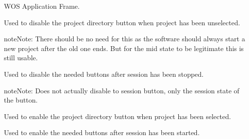\documentclass[letterpaper,10pt,english]{sphinxmanual}
\begin{document}
\begin{fulllineitems}
\label{diwacs:diwacs.GraphicalUserInterface}
WOS Application Frame.

\begin{fulllineitems}
\label{diwacs:diwacs.GraphicalUserInterface.DisableDirectoryButton}
Used to disable the project directory button when project has been
unselected.

\begin{notice}{note}{Note:}
There should be no need for this as the software should
always start a new project after the old one ends.
But for the mid state to be legitimate this is still
usable.
\end{notice}

\end{fulllineitems}


\begin{fulllineitems}
\label{diwacs:diwacs.GraphicalUserInterface.DisableSessionButton}
Used to disable the needed buttons after session has been stopped.

\begin{notice}{note}{Note:}
Does not actually disable to session button, only the session
state of the button.
\end{notice}

\end{fulllineitems}


\begin{fulllineitems}
\label{diwacs:diwacs.GraphicalUserInterface.EnableDirectoryButton}
Used to enable the project directory button when project has been
selected.

\end{fulllineitems}


\begin{fulllineitems}
\label{diwacs:diwacs.GraphicalUserInterface.EnableSessionButton}
Used to enable the needed buttons after session has been started.


\end{fulllineitems}
\end{fulllineitems}
\end{document}
